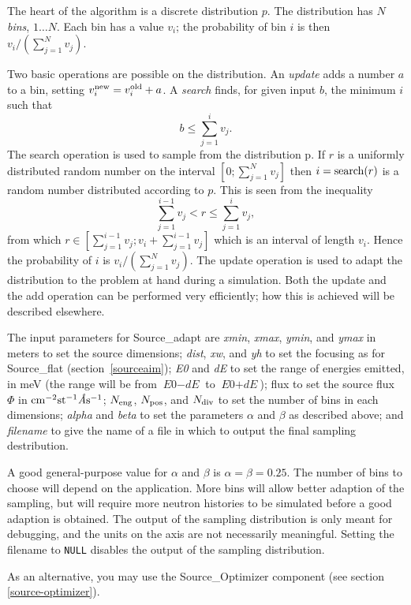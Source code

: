 The heart of the algorithm is a discrete distribution $p$. The
distribution has $N$ \emph{bins}, $1\ldots N$. Each bin has a value
$v_i$; the probability of bin $i$ is then $v_i/(\sum_{j=1}^N v_j)$.

Two basic operations are possible on the distribution. An \emph{update}
adds a number $a$ to a bin, setting $v_i^{\rm new} = v_i^{\rm old} +
a$. A \emph{search} finds, for given input $b$, the minimum $i$ such
that
$$ b \leq \sum_{j=1}^{i} v_j. $$
The search operation is used to sample from the distribution p. If $r$
is a uniformly distributed random number on the interval
$[0;\sum_{j=1}^N v_j]$ then $i = {\rm search}(r)$ is a random number
distributed according to $p$. This is seen from the inequality
$$ \sum_{j=1}^{i-1} v_j < r \leq \sum_{j=1}^{i} v_j, $$
from which $r \in [\sum_{j=1}^{i-1} v_j; v_i + \sum_{j=1}^{i-1} v_j]$
which is an interval of length $v_i$. Hence the probability of $i$ is
$v_i/(\sum_{j=1}^N v_j)$.
The update operation is used to
adapt the distribution to the problem at hand during a simulation. Both
the update and the add operation can be performed very efficiently; how
this is achieved will be described elsewhere.

The input parameters for Source\_adapt are
\textit{xmin}, \textit{xmax}, \textit{ymin}, and
\textit{ymax} in meters to set the source dimensions;
\textit{dist}, \textit{xw}, and \textit{yh}
to set the focusing as for Source\_flat (section~\ref{sourceaim}); \textit{E0} and
\textit{dE} to set the range of energies emitted, in meV (the range
will be from $\textit{E0} - \textit{dE}$ to
$\textit{E0} + \textit{dE}$); flux to set the source flux $\Phi$ in ${\rm
  cm}^{-2} {\rm st}^{-1} \textit{\AA} {\rm s}^{-1}$;
$N_{\rm eng}$, $N_{\rm pos}$, and $N_{\rm
  div}$ to set the number of bins in each dimensions; \textit{alpha} and
\textit{beta} to set the parameters $\alpha$ and $\beta$ as described
above; and \textit{filename} to give the name of a file in which to
output the final sampling destribution.

A good general-purpose value for $\alpha$ and $\beta$ is $\alpha = \beta
= 0.25$. The number of bins to choose will depend on the
application. More bins will allow better adaption of the sampling, but
will require more neutron histories to be simulated before a good
adaption is obtained. The output of the sampling distribution is only
meant for debugging, and the units on the axis are not necessarily
meaningful. Setting the filename to \verb+NULL+ disables the output of
the sampling distribution.

As an alternative, you may use the Source\_Optimizer component (see section \ref{source-optimizer}).

